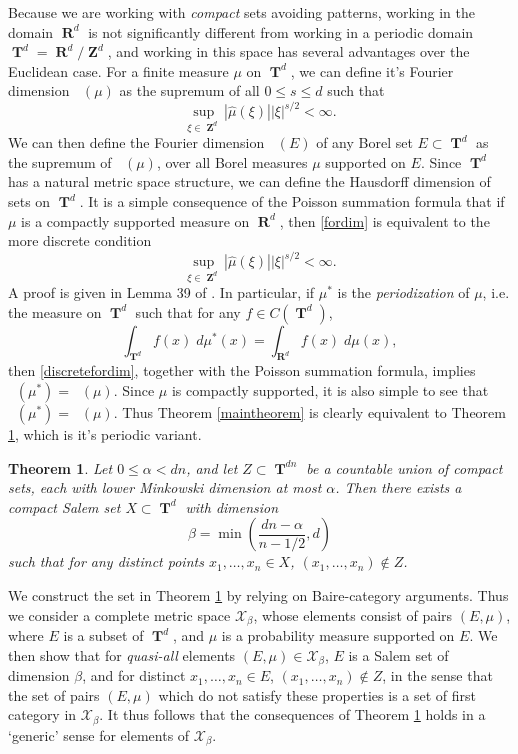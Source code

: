 \documentclass[12pt,reqno]{article}
\numberwithin{equation}{section}
\DeclareMathOperator{\hausdim}{\dim_{\mathbf{H}}}
\DeclareMathOperator{\fordim}{\dim_{\mathbf{F}}}
\DeclareMathOperator{\RR}{\mathbf{R}}
\DeclareMathOperator{\ZZ}{\mathbf{Z}}
\DeclareMathOperator{\TT}{\mathbf{T}}
\newtheorem{theorem}{Theorem}
\begin{document}
Because we are working with \emph{compact} sets avoiding patterns, working in the domain $\RR^d$ is not significantly different from working in a periodic domain $\TT^d = \RR^d / \ZZ^d$, and working in this space has several advantages over the Euclidean case. For a finite measure $\mu$ on $\TT^d$, we can define it's Fourier dimension $\fordim(\mu)$ as the supremum of all $0 \leq s \leq d$ such that
%
\begin{equation} \label{fordimtorus}
    \sup_{\xi \in \ZZ^d} |\widehat{\mu}(\xi)| |\xi|^{s/2} < \infty.
\end{equation}
%
We can then define the Fourier dimension $\fordim(E)$ of any Borel set $E \subset \TT^d$ as the supremum of $\fordim(\mu)$, over all Borel measures $\mu$ supported on $E$. Since $\TT^d$ has a natural metric space structure, we can define the Hausdorff dimension of sets on $\TT^d$. It is a simple consequence of the Poisson summation formula that if $\mu$ is a compactly supported measure on $\RR^d$, then \eqref{fordim} is equivalent to the more discrete condition
%
\begin{equation} \label{discretefordim}
    \sup_{\xi \in \ZZ^d} |\widehat{\mu}(\xi)| |\xi|^{s/2} < \infty.
\end{equation}
%
A proof is given in Lemma 39 of \cite{myThesis}. In particular, if $\mu^*$ is the \emph{periodization} of $\mu$, i.e. the measure on $\TT^d$ such that for any $f \in C(\TT^d)$,
%
\begin{equation}
    \int_{\TT^d} f(x)\; d\mu^*(x) = \int_{\RR^d} f(x)\; d\mu(x),
\end{equation}
%
then \eqref{discretefordim}, together with the Poisson summation formula, implies $\fordim(\mu^*) = \fordim(\mu)$. Since $\mu$ is compactly supported, it is also simple to see that $\hausdim(\mu^*) = \hausdim(\mu)$. Thus Theorem \ref{maintheorem} is clearly equivalent to Theorem \ref{periodictheorem}, which is it's periodic variant.

\begin{theorem} \label{periodictheorem}
    Let $0 \leq \alpha < dn$, and let $Z \subset \TT^{dn}$ be a countable union of compact sets, each with lower Minkowski dimension at most $\alpha$. Then there exists a compact Salem set $X \subset \TT^d$ with dimension
    \[ \beta = \min \left( \frac{dn - \alpha}{n-1/2}, d \right) \]
    such that for any distinct points $x_1, \dots, x_n \in X$, $(x_1, \dots, x_n) \not \in Z$.
\end{theorem}

We construct the set in Theorem \ref{periodictheorem} by relying on Baire-category arguments. Thus we consider a complete metric space $\mathcal{X}_\beta$, whose elements consist of pairs $(E,\mu)$, where $E$ is a subset of $\TT^d$, and $\mu$ is a probability measure supported on $E$. We then show that for \emph{quasi-all} elements $(E,\mu) \in \mathcal{X}_\beta$, $E$ is a Salem set of dimension $\beta$, and for distinct $x_1,\dots,x_n \in E$, $(x_1,\dots,x_n) \not \in Z$, in the sense that the set of pairs $(E,\mu)$ which do not satisfy these properties is a set of first category in $\mathcal{X}_\beta$. It thus follows that the consequences of Theorem \ref{periodictheorem} holds in a `generic' sense for elements of $\mathcal{X}_\beta$.
\end{document}
